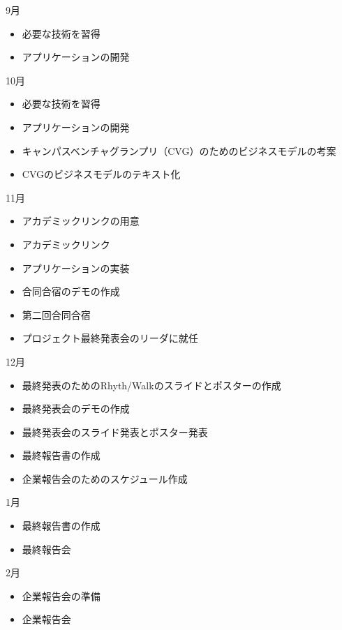 9月
\begin{itemize}
\item 必要な技術を習得
\item アプリケーションの開発
\end{itemize}
10月
\begin{itemize}
\item 必要な技術を習得
\item アプリケーションの開発
\item キャンパスベンチャグランプリ（CVG）のためのビジネスモデルの考案
\item CVGのビジネスモデルのテキスト化
\end{itemize}
11月
\begin{itemize}
\item アカデミックリンクの用意
\item アカデミックリンク
\item アプリケーションの実装
\item 合同合宿のデモの作成
\item 第二回合同合宿
\item プロジェクト最終発表会のリーダに就任
\end{itemize}
12月
\begin{itemize}
\item 最終発表のためのRhyth/Walkのスライドとポスターの作成
\item 最終発表会のデモの作成
\item 最終発表会のスライド発表とポスター発表
\item 最終報告書の作成
\item 企業報告会のためのスケジュール作成
\end{itemize}
1月
\begin{itemize}
\item 最終報告書の作成
\item 最終報告会
\end{itemize}
2月
\begin{itemize}
\item 企業報告会の準備
\item 企業報告会
\end{itemize}
